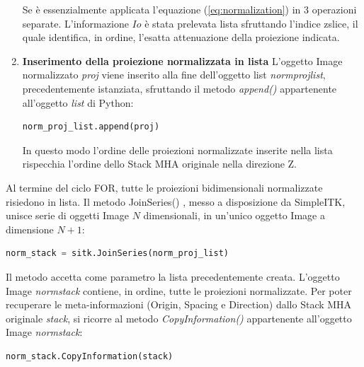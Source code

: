 \documentclass[a4paper,12pt, doubleside]{report}
\begin{document}
\begin{enumerate}
                    Se è essenzialmente applicata l'equazione (\ref{eq:normalization}) in 3 operazioni separate. L'informazione $Io$ è stata prelevata lista sfruttando l'indice zslice, il quale identifica, in ordine, l'esatta attenuazione della proiezione indicata.
                    
                    \item \textbf{Inserimento della proiezione normalizzata in lista} L'oggetto Image normalizzato \textit{proj} viene inserito alla fine dell'oggetto list \textit{norm\textunderscore proj\textunderscore list}, precedentemente istanziata, sfruttando il metodo \textit{append()} \cite{python-append} appartenente all'oggetto \textit{list} di Python:
                    
                    \begin{lstlisting}[language=python, frame=bt]
norm_proj_list.append(proj)
                    \end{lstlisting}
                    
                    In questo modo l'ordine delle proiezioni normalizzate inserite nella lista rispecchia l'ordine dello Stack MHA originale nella direzione Z.
                \end{enumerate}
                
                Al termine del ciclo FOR, tutte le proiezioni bidimensionali normalizzate risiedono in lista. Il metodo JoinSeries() \cite{sitk-joinseries}, messo a disposizione da SimpleITK, unisce serie di oggetti Image $N$ dimensionali, in un'unico oggetto Image a dimensione $N+1$:
                
                \begin{lstlisting}[language=python, frame=bt]
norm_stack = sitk.JoinSeries(norm_proj_list)
                \end{lstlisting}
                    
                Il metodo accetta come parametro la lista precedentemente creata. L'oggetto Image \textit{norm\textunderscore stack} contiene, in ordine, tutte le proiezioni normalizzate. Per poter recuperare le meta-informazioni (Origin, Spacing e Direction) dallo Stack MHA originale \textit{stack}, si ricorre al metodo \textit{CopyInformation()} \cite{sitk-copy-information} appartenente all'oggetto Image \textit{norm\textunderscore stack}:
                
                \begin{lstlisting}[language=python, frame=bt]
norm_stack.CopyInformation(stack)
                \end{lstlisting}
                
\end{document}
